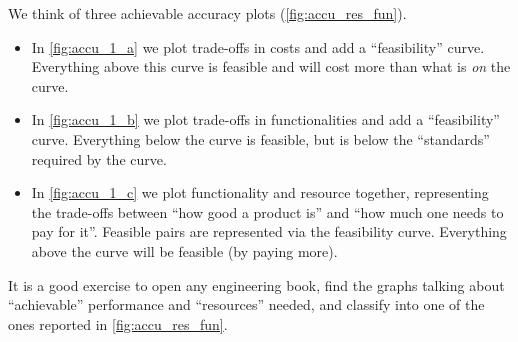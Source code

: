 \begin{figure*}[h]
    \centering
    \hfill
    \hfill
    \hfill
    \caption{}
\end{figure*}

\begin{figure*}[b]
    \centering
    \caption{}
    \label{fig:accu_res_fun}
\end{figure*}

We think of three achievable accuracy plots (\cref{fig:accu_res_fun}).

\begin{itemize}
    \item
          In \cref{fig:accu_1_a} we plot trade-offs in costs and add a ``feasibility'' curve.
          Everything above this curve is feasible and will cost more than what is \emph{on} the curve.
    \item
          In \cref{fig:accu_1_b} we plot trade-offs in functionalities and add a ``feasibility'' curve.
          Everything below the curve is feasible, but is below the ``standards'' required by the curve.
    \item
          In \cref{fig:accu_1_c} we plot functionality and resource together, representing the trade-offs between ``how good a product is'' and ``how much one needs to pay for it''.
          Feasible pairs are represented via the feasibility curve.
          Everything above the curve will be feasible (by paying more).
\end{itemize}

It is a good exercise to open any engineering book, find the graphs talking about ``achievable'' performance and ``resources'' needed, and classify into one of the ones reported in \cref{fig:accu_res_fun}.

